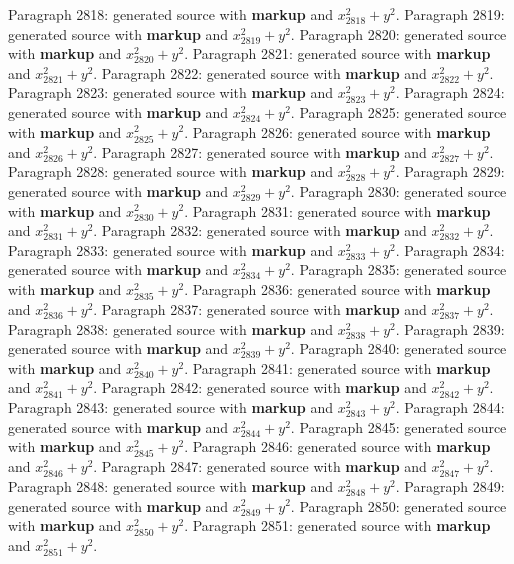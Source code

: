 \documentclass{article}
\begin{document}
Paragraph 2818: generated source with \textbf{markup} and $x_{2818}^2 + y^2$.
Paragraph 2819: generated source with \textbf{markup} and $x_{2819}^2 + y^2$.
Paragraph 2820: generated source with \textbf{markup} and $x_{2820}^2 + y^2$.
Paragraph 2821: generated source with \textbf{markup} and $x_{2821}^2 + y^2$.
Paragraph 2822: generated source with \textbf{markup} and $x_{2822}^2 + y^2$.
Paragraph 2823: generated source with \textbf{markup} and $x_{2823}^2 + y^2$.
Paragraph 2824: generated source with \textbf{markup} and $x_{2824}^2 + y^2$.
Paragraph 2825: generated source with \textbf{markup} and $x_{2825}^2 + y^2$.
Paragraph 2826: generated source with \textbf{markup} and $x_{2826}^2 + y^2$.
Paragraph 2827: generated source with \textbf{markup} and $x_{2827}^2 + y^2$.
Paragraph 2828: generated source with \textbf{markup} and $x_{2828}^2 + y^2$.
Paragraph 2829: generated source with \textbf{markup} and $x_{2829}^2 + y^2$.
Paragraph 2830: generated source with \textbf{markup} and $x_{2830}^2 + y^2$.
Paragraph 2831: generated source with \textbf{markup} and $x_{2831}^2 + y^2$.
Paragraph 2832: generated source with \textbf{markup} and $x_{2832}^2 + y^2$.
Paragraph 2833: generated source with \textbf{markup} and $x_{2833}^2 + y^2$.
Paragraph 2834: generated source with \textbf{markup} and $x_{2834}^2 + y^2$.
Paragraph 2835: generated source with \textbf{markup} and $x_{2835}^2 + y^2$.
Paragraph 2836: generated source with \textbf{markup} and $x_{2836}^2 + y^2$.
Paragraph 2837: generated source with \textbf{markup} and $x_{2837}^2 + y^2$.
Paragraph 2838: generated source with \textbf{markup} and $x_{2838}^2 + y^2$.
Paragraph 2839: generated source with \textbf{markup} and $x_{2839}^2 + y^2$.
Paragraph 2840: generated source with \textbf{markup} and $x_{2840}^2 + y^2$.
Paragraph 2841: generated source with \textbf{markup} and $x_{2841}^2 + y^2$.
Paragraph 2842: generated source with \textbf{markup} and $x_{2842}^2 + y^2$.
Paragraph 2843: generated source with \textbf{markup} and $x_{2843}^2 + y^2$.
Paragraph 2844: generated source with \textbf{markup} and $x_{2844}^2 + y^2$.
Paragraph 2845: generated source with \textbf{markup} and $x_{2845}^2 + y^2$.
Paragraph 2846: generated source with \textbf{markup} and $x_{2846}^2 + y^2$.
Paragraph 2847: generated source with \textbf{markup} and $x_{2847}^2 + y^2$.
Paragraph 2848: generated source with \textbf{markup} and $x_{2848}^2 + y^2$.
Paragraph 2849: generated source with \textbf{markup} and $x_{2849}^2 + y^2$.
Paragraph 2850: generated source with \textbf{markup} and $x_{2850}^2 + y^2$.
Paragraph 2851: generated source with \textbf{markup} and $x_{2851}^2 + y^2$.
\end{document}
